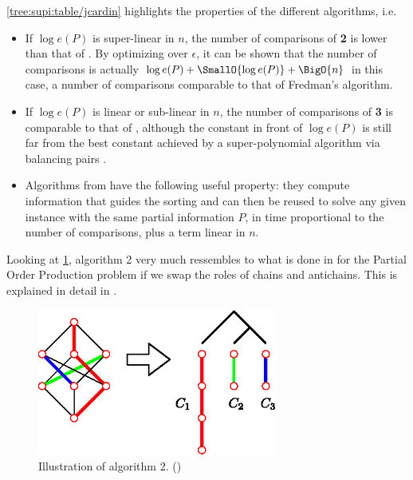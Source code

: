\ref{tree:supi:table/jcardin} highlights the properties of the different algorithms, i.e.

\begin{itemize}

\item If $\log e(P)$ is super-linear in $n$, the number of comparisons of \cite{cardinal2013sorting} \textbf{2} is lower than that of \cite{kahnkim1}. By optimizing over $\epsilon$, it can be shown that the number of comparisons is actually $\log e(P) + \SmallO{\log e(P)} + \BigO{n}$ in this case, a number of comparisons comparable to that of Fredman’s algorithm.

\item If $\log e(P)$ is linear or sub-linear in $n$, the number of comparisons of \cite{cardinal2013sorting} \textbf{3} is comparable to that of \cite{kahnkim1}, although the constant in front of $\log e(P)$ is still far from the best constant achieved by a super-polynomial algorithm via balancing pairs \cite{brightwell1995balancing, brightwell1999balanced}.

\item Algorithms from \cite{cardinal2013sorting} have the following useful property: they compute information that guides the sorting and can then be reused to solve any given instance with the same partial information $P$, in time proportional to the number of comparisons, plus a term linear in $n$.

\end{itemize}


Looking at \ref{fig:supi/alg2}, algorithm 2 very much ressembles to what is done in \cite{jcardin1} for the Partial Order Production problem if we swap the roles of chains and antichains. This is explained in detail in \cite{DBLP:conf/birthday/CardinalF13}.


\begin{figure}
	\centering
	\includegraphics[width=0.7\textwidth]{fig/supi/alg2}
	\caption{\label{fig:supi/alg2} Illustration of algorithm 2. (\cite{cardinal2013sorting})}
\end{figure}



